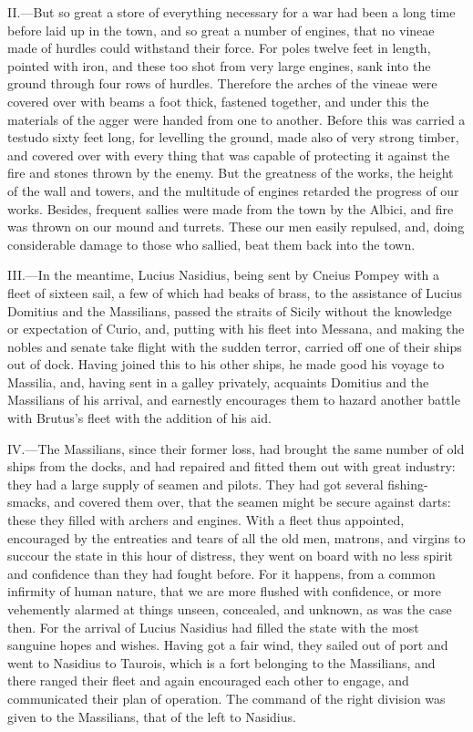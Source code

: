 II.—But so great a store of everything necessary for a war had been a
long time before laid up in the town, and so great a number of engines,
that no vineae made of hurdles could withstand their force. For poles
twelve feet in length, pointed with iron, and these too shot from very
large engines, sank into the ground through four rows of hurdles.
Therefore the arches of the vineae were covered over with beams a foot
thick, fastened together, and under this the materials of the agger were
handed from one to another. Before this was carried a testudo sixty feet
long, for levelling the ground, made also of very strong timber, and
covered over with every thing that was capable of protecting it against
the fire and stones thrown by the enemy. But the greatness of the works,
the height of the wall and towers, and the multitude of engines retarded
the progress of our works. Besides, frequent sallies were made from the
town by the Albici, and fire was thrown on our mound and turrets. These
our men easily repulsed, and, doing considerable damage to those who
sallied, beat them back into the town.

III.—In the meantime, Lucius Nasidius, being sent by Cneius Pompey with
a fleet of sixteen sail, a few of which had beaks of brass, to the
assistance of Lucius Domitius and the Massilians, passed the straits of
Sicily without the knowledge or expectation of Curio, and, putting with
his fleet into Messana, and making the nobles and senate take flight
with the sudden terror, carried off one of their ships out of dock.
Having joined this to his other ships, he made good his voyage to
Massilia, and, having sent in a galley privately, acquaints Domitius and
the Massilians of his arrival, and earnestly encourages them to hazard
another battle with Brutus's fleet with the addition of his aid.

IV.—The Massilians, since their former loss, had brought the same
number of old ships from the docks, and had repaired and fitted them out
with great industry: they had a large supply of seamen and pilots. They
had got several fishing-smacks, and covered them over, that the seamen
might be secure against darts: these they filled with archers and
engines. With a fleet thus appointed, encouraged by the entreaties and
tears of all the old men, matrons, and virgins to succour the state in
this hour of distress, they went on board with no less spirit and
confidence than they had fought before. For it happens, from a common
infirmity of human nature, that we are more flushed with confidence, or
more vehemently alarmed at things unseen, concealed, and unknown, as was
the case then. For the arrival of Lucius Nasidius had filled the state
with the most sanguine hopes and wishes. Having got a fair wind, they
sailed out of port and went to Nasidius to Taurois, which is a fort
belonging to the Massilians, and there ranged their fleet and again
encouraged each other to engage, and communicated their plan of
operation. The command of the right division was given to the
Massilians, that of the left to Nasidius.

